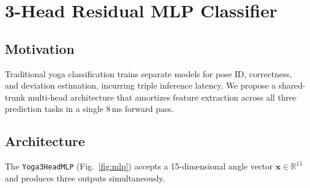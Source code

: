 \documentclass[conference]{IEEEtran}
\begin{document}
\section{3-Head Residual MLP Classifier}
\label{sec:mlp}

\subsection{Motivation}

Traditional yoga classification trains separate models for pose ID, correctness, and
deviation estimation, incurring triple inference latency. We propose a shared-trunk
multi-head architecture that amortizes feature extraction across all three prediction
tasks in a single 8\,ms forward pass.

\subsection{Architecture}

The \texttt{Yoga3HeadMLP} (Fig.~\ref{fig:mlp}) accepts a 15-dimensional angle vector
$\mathbf{x} \in \mathbb{R}^{15}$ and produces three outputs simultaneously.
\end{document}
